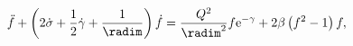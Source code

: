 \begin{equation}\label{eq:KGred}
\ddot f +\left(2\dot\sigma
+\frac{1}{2}\dot\gamma+\frac{1}{\radim}\right)\dot f =
\frac{Q^2}{\radim^2}f\hbox{e}^{-\gamma}+2\beta\left(f^2-1\right)f,
\end{equation}


